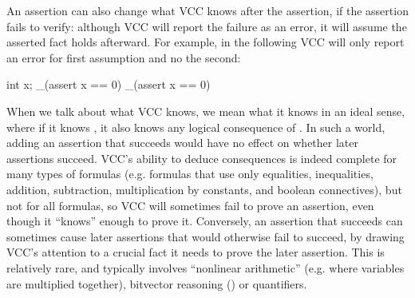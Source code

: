 
An assertion can also change what VCC knows after the assertion, if
the assertion fails to verify: although VCC will report the failure as an error,
it will assume the asserted fact holds afterward. For example, in the following
VCC will only report an error for first assumption and no the second:
\begin{VCC}
int x;
_(assert x == 0)
_(assert x == 0)
\end{VCC}

When we talk about what VCC knows, we mean what it knows in an ideal
sense, where if it knows , it also knows any logical
consequence of . In such a world, adding an assertion that
succeeds would have no effect on whether later assertions succeed.
VCC's ability to deduce consequences is indeed complete for many types
of formulas (e.g. formulas that use only equalities,
inequalities, addition, subtraction, multiplication by constants, and
boolean connectives), but not for all formulas, so VCC will
sometimes fail to prove an assertion, even though it ``knows'' enough
to prove it.  Conversely, an assertion that succeeds can sometimes cause later assertions that
would otherwise fail to succeed, by drawing VCC's attention to a
crucial fact it needs to prove the later assertion.  This is
relatively rare, and typically involves ``nonlinear arithmetic''
(e.g. where variables are multiplied together), bitvector reasoning
() or quantifiers.

